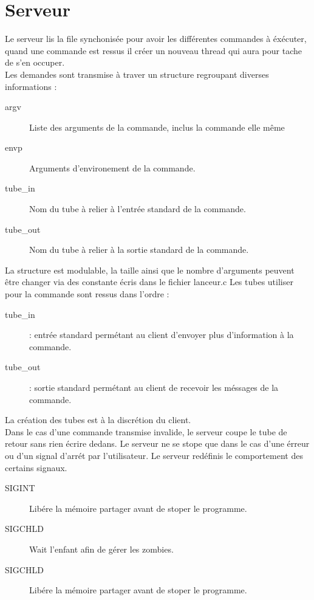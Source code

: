 \documentclass[12pt]{article}
\begin{document}
\newpage
\section{Serveur}
    Le serveur lis la file synchonisée pour avoir les différentes commandes à éxécuter, quand une commande est ressus il créer un nouveau thread qui aura pour tache de s'en occuper.\\
    Les demandes sont transmise à traver un structure regroupant diverses informations :
    \begin{description}
        \item [argv] Liste des arguments de la commande, inclus la commande elle même
        \item [envp] Arguments d'environement de la commande.
        \item [tube\_in] Nom du tube à relier à l'entrée standard de la commande.
        \item [tube\_out] Nom du tube à relier à la sortie standard de la commande.
    \end{description}
    La structure est modulable, la taille ainsi que le nombre d'arguments peuvent être changer via des constante écris dans le fichier lanceur.c
    Les tubes utiliser pour la commande sont ressus dans l'ordre :
    \begin{description}
        \item [tube\_in]  : entrée standard permétant au client d'envoyer plus d'information à la commande.
        \item [tube\_out] : sortie standard permétant au client de recevoir les méssages de la commande.
    \end{description}
    La création des tubes est à la discrétion du client.\\
    Dans le cas d'une commande transmise invalide, le serveur coupe le tube de retour sans rien écrire dedans.
    Le serveur ne se stope que dans le cas d'une érreur ou d'un signal d'arrét par l'utilisateur.
    Le serveur redéfinis le comportement des certains signaux.
    \begin{description}
      \item [SIGINT] Libére la mémoire partager avant de stoper le programme.
      \item [SIGCHLD] Wait l'enfant afin de gérer les zombies.
      \item [SIGCHLD] Libére la mémoire partager avant de stoper le programme.
    \end{description}
\newpage
\end{document}
